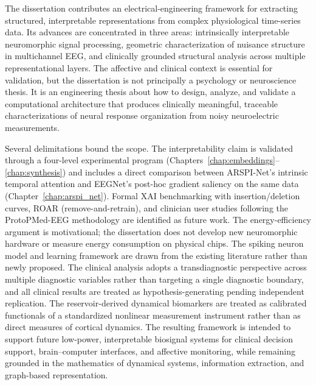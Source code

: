 The dissertation contributes an electrical-engineering framework for extracting structured, interpretable representations from complex physiological time-series data. Its advances are concentrated in three areas: intrinsically interpretable neuromorphic signal processing, geometric characterization of nuisance structure in multichannel EEG, and clinically grounded structural analysis across multiple representational layers. The affective and clinical context is essential for validation, but the dissertation is not principally a psychology or neuroscience thesis. It is an engineering thesis about how to design, analyze, and validate a computational architecture that produces clinically meaningful, traceable characterizations of neural response organization from noisy neuroelectric measurements.

Several delimitations bound the scope. The interpretability claim is validated through a four-level experimental program (Chapters~\ref{chap:embeddings}--\ref{chap:synthesis}) and includes a direct comparison between ARSPI-Net's intrinsic temporal attention and EEGNet's post-hoc gradient saliency on the same data (Chapter~\ref{chap:arspi_net}). Formal XAI benchmarking with insertion/deletion curves, ROAR (remove-and-retrain), and clinician user studies following the ProtoPMed-EEG methodology \cite{barnett_protopmed_2024} are identified as future work. The energy-efficiency argument is motivational; the dissertation does not develop new neuromorphic hardware or measure energy consumption on physical chips. The spiking neuron model and learning framework are drawn from the existing literature rather than newly proposed. The clinical analysis adopts a transdiagnostic perspective across multiple diagnostic variables rather than targeting a single diagnostic boundary, and all clinical results are treated as hypothesis-generating pending independent replication. The reservoir-derived dynamical biomarkers are treated as calibrated functionals of a standardized nonlinear measurement instrument rather than as direct measures of cortical dynamics. The resulting framework is intended to support future low-power, interpretable biosignal systems for clinical decision support, brain--computer interfaces, and affective monitoring, while remaining grounded in the mathematics of dynamical systems, information extraction, and graph-based representation.
